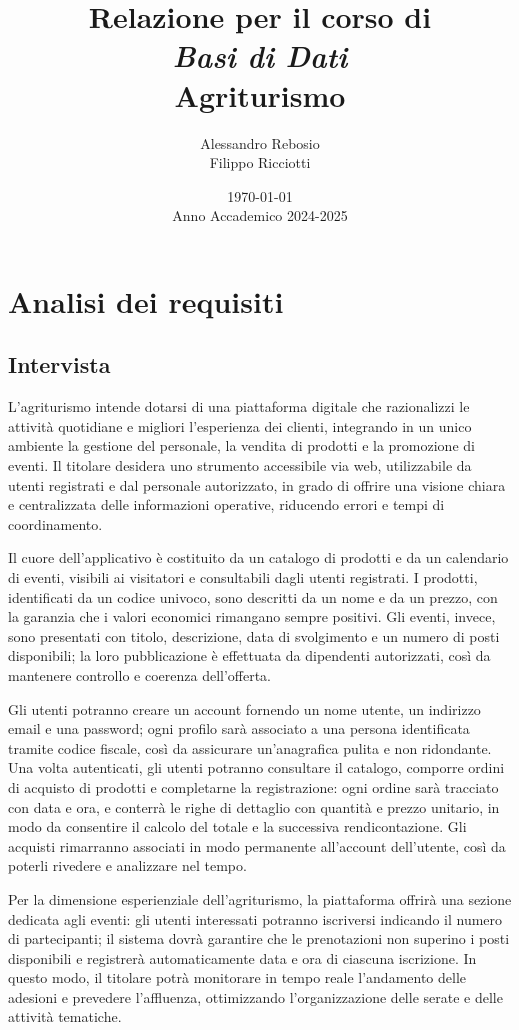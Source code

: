 \documentclass[a4paper,12pt]{report}
\title{
    \vspace*{2cm}
    \LARGE Relazione per il corso di \\[0.5cm]
    \textit{Basi di Dati} \\[2cm]
    \Huge\textbf{Agriturismo} \\[2cm]
}
\author{
    \Large
    Alessandro Rebosio \\
    Filippo Ricciotti
}
\date{
    \vspace{1cm}
    \today \\[0.5cm]
    Anno Accademico 2024-2025
}
\begin{document}
\maketitle

\tableofcontents

\chapter{Analisi dei requisiti}
\section{Intervista}

L'agriturismo intende dotarsi di una piattaforma digitale che razionalizzi le attività quotidiane 
e migliori l'esperienza dei clienti, integrando in un unico ambiente la gestione del personale, 
la vendita di prodotti e la promozione di eventi. Il titolare desidera uno strumento accessibile 
via web, utilizzabile da utenti registrati e dal personale autorizzato, in grado di offrire una 
visione chiara e centralizzata delle informazioni operative, riducendo errori e tempi di 
coordinamento.

Il cuore dell'applicativo è costituito da un catalogo di prodotti e da un calendario di
eventi, visibili ai visitatori e consultabili dagli utenti registrati. I prodotti, identificati 
da un codice univoco, sono descritti da un nome e da un prezzo, con la garanzia che i valori 
economici rimangano sempre positivi. Gli eventi, invece, sono presentati con titolo, 
descrizione, data di svolgimento e un numero di posti disponibili; la loro pubblicazione è 
effettuata da dipendenti autorizzati, così da mantenere controllo e coerenza dell'offerta.

Gli utenti potranno creare un account fornendo un nome utente, un indirizzo email e una 
password; ogni profilo sarà associato a una persona identificata tramite codice fiscale, 
così da assicurare un'anagrafica pulita e non ridondante. Una volta autenticati, gli utenti 
potranno consultare il catalogo, comporre ordini di acquisto di prodotti e completarne la 
registrazione: ogni ordine sarà tracciato con data e ora, e conterrà le righe di dettaglio con 
quantità e prezzo unitario, in modo da consentire il calcolo del totale e la successiva 
rendicontazione. Gli acquisti rimarranno associati in modo permanente all'account dell'utente, 
così da poterli rivedere e analizzare nel tempo.

Per la dimensione esperienziale dell'agriturismo, la piattaforma offrirà una sezione dedicata 
agli eventi: gli utenti interessati potranno iscriversi indicando il numero di partecipanti; il 
sistema dovrà garantire che le prenotazioni non superino i posti disponibili e registrerà 
automaticamente data e ora di ciascuna iscrizione. In questo modo, il titolare potrà monitorare 
in tempo reale l'andamento delle adesioni e prevedere l'affluenza, ottimizzando l'organizzazione 
delle serate e delle attività tematiche.
\end{document}
